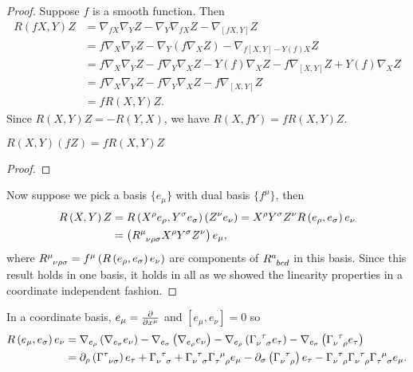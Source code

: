 \begin{proof}
    Suppose $f$ is a smooth function. Then
    \begin{align}
        R \left( f X,Y \right) Z &= \nabla_{fX} \nabla_Y Z - \nabla_Y \nabla_{fX} Z - \nabla_{\left[ fX, Y \right] } Z \\
        &= f \nabla_{X} \nabla_Y Z - \nabla_Y \left( f \nabla_X Z \right) - \nabla_{f \left[ X, Y \right] - Y \left( f \right) X} Z  \\
        &= f \nabla_X \nabla_Y Z - f \nabla_Y \nabla_X Z - Y \left( f \right) \nabla_X Z - f \nabla_{\left[ X, Y \right] } Z + Y \left( f \right) \nabla_X Z \\
        &= f \nabla_X \nabla_Y Z - f \nabla_Y \nabla_X Z - f \nabla_{\left[ X, Y \right] } Z \\
        &= f R \left( X,Y \right) Z 
    .\end{align}
    Since $R \left( X,Y \right) Z = - R \left( Y,X \right) $, we have $R \left( X,fY \right) = f R \left( X,Y \right) Z$.
    \begin{exercise}
        $R \left( X,Y \right) \left( fZ \right) = f R \left( X,Y \right) Z$
    \end{exercise}
    \begin{proof}
        
    \end{proof}
    Now suppose we pick a basis $\{e_{\mu}\} $ with dual basis $\{ f^{\mu}\} $, then
    \begin{align}
        R \left( X,Y \right) Z &= R \left( X^{\rho} e_\rho, Y^{\sigma} e_{\sigma} \right) \left( Z^{\nu} e_\nu \right) = X^{\rho} Y^{\sigma} Z^{\nu} R \left( e_{\rho}, e_{\sigma} \right) e_{\nu} \\
        &= \left( \tensor{R}{^{\mu}_{\nu \rho \sigma}} X^{\rho} Y^{\sigma} Z^{\nu} \right) e_{\mu}
    ,\end{align}
    where $\tensor{R}{^{\mu}_{\nu \rho \sigma}} = f^{\mu} \left( R \left( e_{\rho}, e_{\sigma} \right) e_{\nu} \right) $ are components of $\tensor{R}{^{a}_{bcd}}$ in this basis. Since this result holds in one basis, it holds in all as we showed the linearity properties in a coordinate independent fashion.
\end{proof}

In a coordinate basis, $e_{\mu} = \pdv{x^{\mu}}$ and $\left[ e_{\mu}, e_{\nu} \right]  = 0$ so
\begin{align}
    R \left( e_\mu , e_{\sigma} \right) e_{\nu} &= \nabla_{e_{\rho}} \left( \nabla_{e_\sigma} e_{\nu} \right) - \nabla_{e_\sigma} \left( \nabla_{e_\rho} e_{\nu} \right)  - \nabla_{e_\rho} \left( \tensor{\Gamma}{_{\nu}^{\tau}_\sigma} e_{\tau} \right) - \nabla_{e_\sigma} \left( \tensor{\Gamma}{_{\nu}^{\tau}_{\rho}} e_{\tau} \right) \\
    &= \partial_\rho \left( \tensor{\Gamma}{^{\tau}_{\nu \sigma}} \right) e_{\tau} + \tensor{\Gamma}{_{\nu}^{\tau}_{\sigma}} + \tensor{\Gamma}{_{\nu}^{\tau}_{\sigma}} \tensor{\Gamma}{_{\tau}^{\mu}_{\rho}} e_{\mu} - \partial_\sigma \left( \tensor{\Gamma}{_{\nu}^{\tau}_{\rho}} \right) e_{\tau} - \tensor{\Gamma}{_{\nu}^{\tau}_{\rho}} \tensor{\Gamma}{_{\nu}^{\tau}_{\rho}} \tensor{\Gamma}{_{\tau}^{\mu}_{\sigma}} e_{\mu}
.\end{align}

